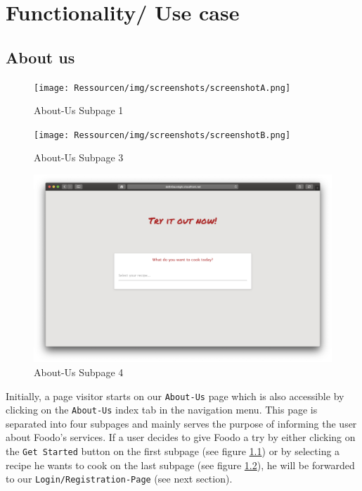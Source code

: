 \chapter{Functionality/ Use case}
\section*{About us}
\vspace{-1em}
\begin{figure}[H]
	\captionsetup{justification=centering}
	\begin{center}
		\texttt{[image: Ressourcen/img/screenshots/screenshotA.png]}
		\vspace{-3em}
		\caption{About-Us Subpage 1}
		\label{fig:subpage}
	\end{center}
\end{figure}
\vspace{-1em}
\begin{figure}[H]
	\captionsetup{justification=centering}
	\begin{center}
		\texttt{[image: Ressourcen/img/screenshots/screenshotB.png]}
		\vspace{-3em}
		\caption{About-Us Subpage 3}
	\end{center}
\end{figure}
\vspace{-1em}
\begin{figure}[H]
	\captionsetup{justification=centering}
	\begin{center}
		\includegraphics[scale=0.30]{Ressourcen/img/screenshots/screenshotC.png}
		\vspace{-3em}
		\caption{About-Us Subpage 4}
		\label{fig:subpage4}
	\end{center}
\end{figure}
\vspace{-3em}
Initially, a page visitor starts on our \texttt{About-Us} page which is also accessible by clicking on the \texttt{About-Us} index tab in the navigation menu. This page is separated into four subpages and mainly serves the purpose of informing the user about Foodo's services. If a user decides to give Foodo a try by either clicking on the \texttt{Get Started} button on the first subpage (see figure \ref{fig:subpage}) or by selecting a recipe he wants to cook on the last subpage (see figure \ref{fig:subpage4}), he will be forwarded to our \texttt{Login/Registration-Page} (see next section).
